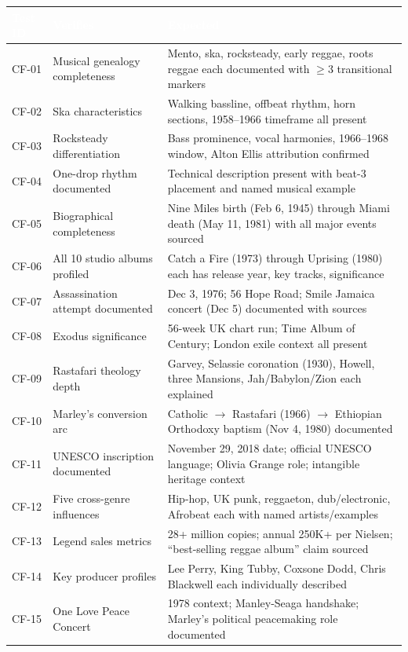 \documentclass[11pt,letterpaper]{article}
\newcommand{\tableheader}[1]{\textbf{\sffamily\textcolor{white}{#1}}}
\begin{document}
\begin{center}
\begin{tabularx}{\textwidth}{C{1.5cm}L{4.5cm}X}
\toprule
{}
\tableheader{Test ID} & \tableheader{Verifies} & \tableheader{Expected} \\
\midrule
CF-01 & Musical genealogy completeness & Mento, ska, rocksteady, early reggae, roots reggae each documented with $\geq$3 transitional markers \\
CF-02 & Ska characteristics & Walking bassline, offbeat rhythm, horn sections, 1958--1966 timeframe all present \\
CF-03 & Rocksteady differentiation & Bass prominence, vocal harmonies, 1966--1968 window, Alton Ellis attribution confirmed \\
CF-04 & One-drop rhythm documented & Technical description present with beat-3 placement and named musical example \\
CF-05 & Biographical completeness & Nine Miles birth (Feb 6, 1945) through Miami death (May 11, 1981) with all major events sourced \\
CF-06 & All 10 studio albums profiled & Catch a Fire (1973) through Uprising (1980) each has release year, key tracks, significance \\
CF-07 & Assassination attempt documented & Dec 3, 1976; 56 Hope Road; Smile Jamaica concert (Dec 5) documented with sources \\
CF-08 & Exodus significance & 56-week UK chart run; Time Album of Century; London exile context all present \\
CF-09 & Rastafari theology depth & Garvey, Selassie coronation (1930), Howell, three Mansions, Jah/Babylon/Zion each explained \\
CF-10 & Marley's conversion arc & Catholic $\rightarrow$ Rastafari (1966) $\rightarrow$ Ethiopian Orthodoxy baptism (Nov 4, 1980) documented \\
CF-11 & UNESCO inscription documented & November 29, 2018 date; official UNESCO language; Olivia Grange role; intangible heritage context \\
CF-12 & Five cross-genre influences & Hip-hop, UK punk, reggaeton, dub/electronic, Afrobeat each with named artists/examples \\
CF-13 & Legend sales metrics & 28+ million copies; annual 250K+ per Nielsen; ``best-selling reggae album'' claim sourced \\
CF-14 & Key producer profiles & Lee Perry, King Tubby, Coxsone Dodd, Chris Blackwell each individually described \\
CF-15 & One Love Peace Concert & 1978 context; Manley-Seaga handshake; Marley's political peacemaking role documented \\
\bottomrule
\end{tabularx}
\end{center}
\end{document}
